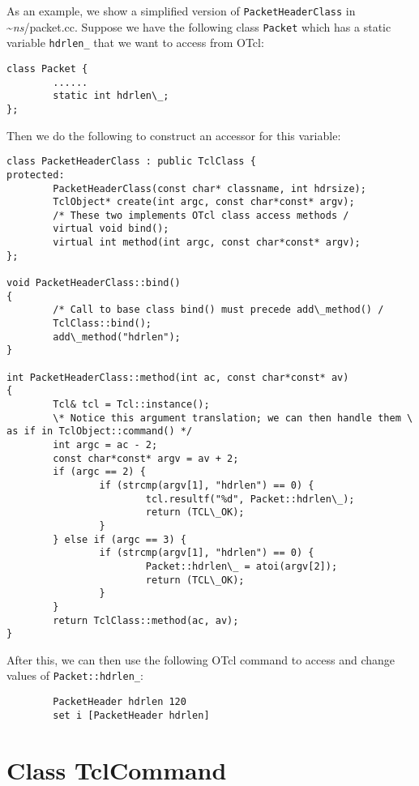 As an example, we show a simplified version of
{\tt PacketHeaderClass} in \textasciitilde\emph{ns}/{packet.cc}. 
Suppose we have the following class {\tt Packet} which has a static
variable {\tt hdrlen\_} that we want to access from OTcl:
\begin{verbatim}
class Packet {
        ......
        static int hdrlen\_;
};
\end{verbatim}
Then we do the following to construct an accessor for this variable:
\begin{verbatim}
class PacketHeaderClass : public TclClass {
protected:
        PacketHeaderClass(const char* classname, int hdrsize);
        TclObject* create(int argc, const char*const* argv);
        /* These two implements OTcl class access methods /
        virtual void bind();
        virtual int method(int argc, const char*const* argv);
};

void PacketHeaderClass::bind()
{
        /* Call to base class bind() must precede add\_method() /
        TclClass::bind();
        add\_method("hdrlen");
}

int PacketHeaderClass::method(int ac, const char*const* av)
{
        Tcl& tcl = Tcl::instance();
        \* Notice this argument translation; we can then handle them \
as if in TclObject::command() */
        int argc = ac - 2;
        const char*const* argv = av + 2;
        if (argc == 2) {
                if (strcmp(argv[1], "hdrlen") == 0) {
                        tcl.resultf("%d", Packet::hdrlen\_);
                        return (TCL\_OK);
                }
        } else if (argc == 3) {
                if (strcmp(argv[1], "hdrlen") == 0) {
                        Packet::hdrlen\_ = atoi(argv[2]);
                        return (TCL\_OK);
                }
        }
        return TclClass::method(ac, av);
}
\end{verbatim}
After this, we can then use the following OTcl command to access and
change values of {\tt Packet::hdrlen\_}:
\begin{verbatim}
        PacketHeader hdrlen 120
        set i [PacketHeader hdrlen]
\end{verbatim}

\section{Class TclCommand}
\label{sec:TclCommand}

